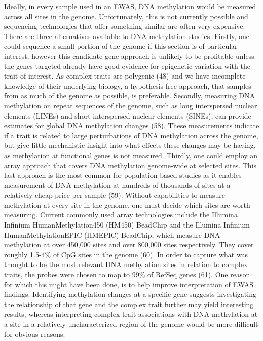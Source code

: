 \documentclass[11pt,oneside]{bristolthesis}
\begin{document}
Ideally, in every sample used in an EWAS, DNA methylation would be measured across all sites in the genome. Unfortunately, this is not currently possible and sequencing technologies that offer something similar are often very expensive. There are three alternatives available to DNA methylation studies. Firstly, one could sequence a small portion of the genome if this section is of particular interest, however this candidate gene approach is unlikely to be profitable unless the genes targeted already have good evidence for epigenetic variation with the trait of interest. As complex traits are polygenic (48) and we have incomplete knowledge of their underlying biology, a hypothesis-free approach, that samples from as much of the genome as possible, is preferable. Secondly, measuring DNA methylation on repeat sequences of the genome, such as long interspersed nuclear elements (LINEs) and short interspersed nuclear elements (SINEs), can provide estimates for global DNA methylation changes (58). These measurements indicate if a trait is related to large perturbations of DNA methylation across the genome, but give little mechanistic insight into what effects these changes may be having, as methylation at functional genes is not measured. Thirdly, one could employ an array approach that covers DNA methylation genome-wide at selected sites. This last approach is the most common for population-based studies as it enables measurement of DNA methylation at hundreds of thousands of sites at a relatively cheap price per sample (59). Without capabilities to measure methylation at every site in the genome, one must decide which sites are worth measuring. Current commonly used array technologies include the Illumina Infinium HumanMethylation450 (HM450) BeadChip and the Illumina Infinium HumanMethylationEPIC (HMEPIC) BeadChip, which measure DNA methylation at over 450,000 sites and over 800,000 sites respectively. They cover roughly 1.5-4\% of CpG sites in the genome (60). In order to capture what was thought to be the most relevant DNA methylation sites in relation to complex traits, the probes were chosen to map to 99\% of RefSeq genes (61). One reason for which this might have been done, is to help improve interpretation of EWAS findings. Identifying methylation changes at a specific gene suggests investigating the relationship of that gene and the complex trait further may yield interesting results, whereas interpreting complex trait associations with DNA methylation at a site in a relatively uncharacterized region of the genome would be more difficult for obvious reasons.
\end{document}
